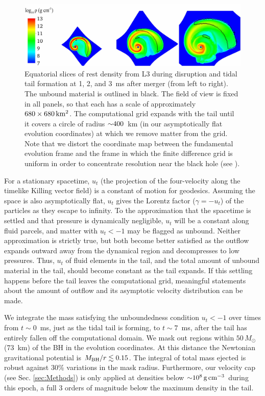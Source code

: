 \begin{figure}
\centering
\includegraphics[width=16cm]{Figures/rho_unbound_1ms_2ms_3ms}
\caption[Time sequence of dynamical ejecta]{
Equatorial slices of rest density from L3
during disruption and tidal tail formation at 1, 2, and 3~ms after merger
(from left to right).
The unbound material is outlined in black. The field of
view is fixed in all panels, so that each
has a scale of approximately $680\times680\rm\,km^2$.
The computational grid expands with the tail until it covers a circle of
radius $\mathord{\sim}400$~km (in our asymptotically flat evolution coordinates)
at which we remove matter from the grid. Note that we distort the
coordinate map between the fundamental evolution frame and the
frame in which the finite difference grid is uniform
in order to concentrate resolution near the black hole (see \citealt{duez2009-3d_eos_advection}).
}
\label{fig:disruptionsnapshots}
\end{figure}

For a stationary spacetime, $u_t$ (the projection of the four-velocity along
the timelike Killing vector field) is a constant of motion for geodesics. 
Assuming the space is also asymptotically flat, $u_t$ gives the Lorentz
factor ($\gamma=-u_t$) of the particles as they escape to infinity.  To the
approximation that the spacetime is settled and that pressure is dynamically
negligible, $u_t$ will be a constant along fluid parcels, and matter with
$u_t<-1$ may be flagged as unbound. Neither approximation is strictly true,
but both become better satisfied as the outflow expands outward away from
the dynamical region and decompresses to low pressures.  Thus, $u_t$ of
fluid elements in the tail, and the total amount of unbound material in
the tail, should become constant as the tail expands.  If this settling
happens before the tail leaves the computational grid, meaningful statements
about the amount of outflow and its asymptotic velocity distribution can
be made.

We integrate the mass satisfying the unboundedness
condition $u_t<-1$ over times from $t \sim 0$~ms, just as
the tidal tail is forming, to $t \sim 7$~ms, after the tail has entirely fallen off
the computational domain. We mask out regions within
$50\,M_{\odot}$ (73~km) of the BH in the evolution coordinates.
At this distance the Newtonian gravitational
potential is $M_{\rm BH}/r \lesssim 0.15$.
The integral of total mass ejected is robust against
30\% variations in the mask radius.
Furthermore, our velocity cap (see Sec. \ref{sec:Methods}) is only applied
at densities below $\mathord{\sim} 10^{8}\rm\,g\,cm^{-3}$ during this epoch, a full 3
orders of magnitude below the maximum density in the tail.

